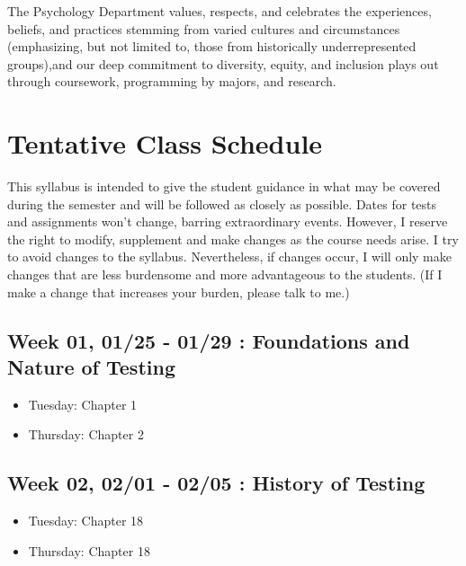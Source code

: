\documentclass[11pt,]{article}
\providecommand{\tightlist}{%
  \setlength{\itemsep}{0pt}\setlength{\parskip}{0pt}}
\begin{document}
The Psychology Department values, respects, and celebrates the
experiences, beliefs, and practices stemming from varied cultures and
circumstances (emphasizing, but not limited to, those from historically
underrepresented groups),and our deep commitment to diversity, equity,
and inclusion plays out through coursework, programming by majors, and
research.

\hypertarget{tentative-class-schedule}{%
\section{Tentative Class Schedule}\label{tentative-class-schedule}}

This syllabus is intended to give the student guidance in what may be
covered during the semester and will be followed as closely as possible.
Dates for tests and assignments won't change, barring extraordinary
events. However, I reserve the right to modify, supplement and make
changes as the course needs arise. I try to avoid changes to the
syllabus. Nevertheless, if changes occur, I will only make changes that
are less burdensome and more advantageous to the students. (If I make a
change that increases your burden, please talk to me.)

\hypertarget{week-01-0125---0129-foundations-and-nature-of-testing}{%
\subsection{Week 01, 01/25 - 01/29 : Foundations and Nature of
Testing}\label{week-01-0125---0129-foundations-and-nature-of-testing}}

\begin{itemize}
\tightlist
\item
  Tuesday: Chapter 1
\item
  Thursday: Chapter 2
\end{itemize}

\hypertarget{week-02-0201---0205-history-of-testing}{%
\subsection{Week 02, 02/01 - 02/05 : History of
Testing}\label{week-02-0201---0205-history-of-testing}}

\begin{itemize}
\tightlist
\item
  Tuesday: Chapter 18
\item
  Thursday: Chapter 18
\end{itemize}
\end{document}
